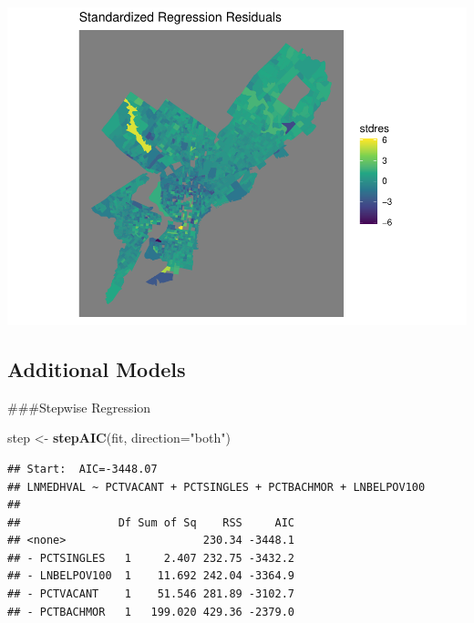 \documentclass[
]{article}
\newenvironment{Shaded}{\begin{snugshade}}{\end{snugshade}}
\newcommand{\AttributeTok}[1]{\textcolor[rgb]{0.13,0.29,0.53}{#1}}
\newcommand{\CommentTok}[1]{\textcolor[rgb]{0.56,0.35,0.01}{\textit{#1}}}
\newcommand{\FunctionTok}[1]{\textcolor[rgb]{0.13,0.29,0.53}{\textbf{#1}}}
\newcommand{\NormalTok}[1]{#1}
\newcommand{\OtherTok}[1]{\textcolor[rgb]{0.56,0.35,0.01}{#1}}
\newcommand{\SpecialCharTok}[1]{\textcolor[rgb]{0.81,0.36,0.00}{\textbf{#1}}}
\newcommand{\StringTok}[1]{\textcolor[rgb]{0.31,0.60,0.02}{#1}}
\begin{document}
\includegraphics{HW1-Regression_files/figure-latex/resid map-1.pdf}

\hypertarget{additional-models}{%
\subsection{Additional Models}\label{additional-models}}

\#\#\#Stepwise Regression

\begin{Shaded}
\begin{Highlighting}[]
\NormalTok{step }\OtherTok{\textless{}{-}} \FunctionTok{stepAIC}\NormalTok{(fit, }\AttributeTok{direction=}\StringTok{"both"}\NormalTok{)}
\end{Highlighting}
\end{Shaded}

\begin{verbatim}
## Start:  AIC=-3448.07
## LNMEDHVAL ~ PCTVACANT + PCTSINGLES + PCTBACHMOR + LNBELPOV100
## 
##               Df Sum of Sq    RSS     AIC
## <none>                     230.34 -3448.1
## - PCTSINGLES   1     2.407 232.75 -3432.2
## - LNBELPOV100  1    11.692 242.04 -3364.9
## - PCTVACANT    1    51.546 281.89 -3102.7
## - PCTBACHMOR   1   199.020 429.36 -2379.0
\end{verbatim}

\begin{Shaded}
\end{Shaded}
\end{document}

